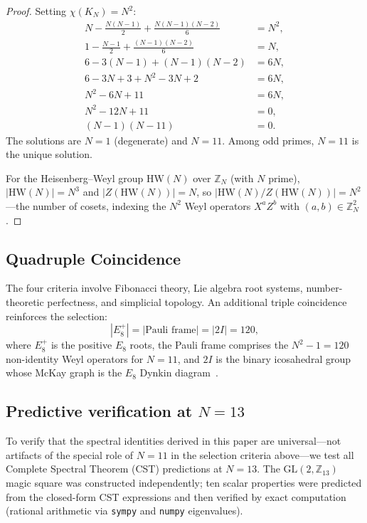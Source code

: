 \documentclass[aip,jmp,reprint,superscriptaddress,floatfix,nofootinbib]{revtex4-2}
\theoremstyle{definition}
\theoremstyle{remark}
\newcommand{\ZN}{\mathbb{Z}_N}
\newcommand{\GL}{\mathrm{GL}}
\newcommand{\HW}{\mathrm{HW}}
\begin{document}
\begin{proof}
Setting $\chi(K_N) = N^2$:
\begin{align}
N - \frac{N(N-1)}{2} + \frac{N(N-1)(N-2)}{6} &= N^2, \\
1 - \frac{N-1}{2} + \frac{(N-1)(N-2)}{6} &= N, \\
6 - 3(N-1) + (N-1)(N-2) &= 6N, \\
6 - 3N + 3 + N^2 - 3N + 2 &= 6N, \\
N^2 - 6N + 11 &= 6N, \\
N^2 - 12N + 11 &= 0, \\
(N - 1)(N - 11) &= 0.
\end{align}
The solutions are $N = 1$ (degenerate) and $N = 11$.  Among odd
primes, $N = 11$ is the unique solution.

For the Heisenberg--Weyl group $\HW(N)$ over $\ZN$ (with $N$ prime),
$|\HW(N)| = N^3$ and $|Z(\HW(N))| = N$, so
$|\HW(N)/Z(\HW(N))| = N^2$---the number of cosets, indexing
the $N^2$ Weyl operators $X^a Z^b$ with $(a,b) \in \ZN^2$.
\end{proof}

\subsection{Quadruple Coincidence}
\label{sec:n11:triple}

The four criteria involve Fibonacci theory, Lie algebra root systems,
number-theoretic perfectness, and simplicial topology.  An additional
triple coincidence reinforces the selection:
\begin{equation}\label{eq:triple-120}
|E_8^+| = |\text{Pauli frame}| = |2I| = 120,
\end{equation}
where $E_8^+$ is the positive $E_8$ roots, the Pauli frame comprises
the $N^2 - 1 = 120$ non-identity Weyl operators for $N = 11$, and
$2I$ is the binary icosahedral group whose McKay graph is the $E_8$
Dynkin diagram~\cite{McKay1980}.

\subsection{Predictive verification at \texorpdfstring{$N=13$}{N=13}}
\label{sec:n11:n13verify}

To verify that the spectral identities derived in this paper are
universal---not artifacts of the special role of $N = 11$ in the
selection criteria above---we test all Complete Spectral Theorem (CST)
predictions at $N = 13$.  The $\GL(2,\mathbb{Z}_{13})$ magic square
was constructed independently; ten scalar properties were predicted from
the closed-form CST expressions and then verified by exact computation
(rational arithmetic via \texttt{sympy} and \texttt{numpy} eigenvalues).
\end{document}
